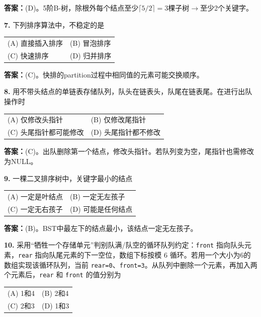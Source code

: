 \ifshowsolutions\par\noindent\textbf{答案：}(D)。5阶B-树，除根外每个结点至少$\lceil5/2\rceil=3$棵子树$\to$至少2个关键字。\else \answerarea \fi

\vspace{6pt}

\noindent\textbf{7.} 下列排序算法中，不稳定的是
\begin{center}
\begin{tabular}{ll}
(A) 直接插入排序 & (B) 冒泡排序 \\[6pt]
(C) 快速排序 & (D) 归并排序
\end{tabular}
\end{center}

\ifshowsolutions\par\noindent\textbf{答案：}(C)。快排的partition过程中相同值的元素可能交换顺序。\else \answerarea \fi

\vspace{6pt}

\noindent\textbf{8.} 用不带头结点的单链表存储队列，队头在链表头，队尾在链表尾。在进行出队操作时
\begin{center}
\begin{tabular}{ll}
(A) 仅修改头指针 & (B) 仅修改尾指针 \\[6pt]
(C) 头尾指针都可能修改 & (D) 头尾指针都不修改
\end{tabular}
\end{center}

\ifshowsolutions\par\noindent\textbf{答案：}(C)。出队删除第一个结点，修改头指针。若队列变为空，尾指针也需修改为NULL。\else \answerarea \fi

\vspace{6pt}

\noindent\textbf{9.} 一棵二叉排序树中，关键字最小的结点
\begin{center}
\begin{tabular}{ll}
(A) 一定是叶结点 & (B) 一定无左孩子 \\[6pt]
(C) 一定无右孩子 & (D) 可能是任何结点
\end{tabular}
\end{center}

\ifshowsolutions\par\noindent\textbf{答案：}(B)。BST中最左下的结点最小，该结点一定无左孩子。\else \answerarea \fi

\vspace{6pt}

\noindent\textbf{10.} 采用“牺牲一个存储单元”判别队满/队空的循环队列约定：\texttt{front} 指向队头元素，\texttt{rear} 指向队尾元素的下一空位，数组下标按模 6 循环。若用一个大小为6的数组实现该循环队列，当前 \texttt{rear=0}、\texttt{front=3}。从队列中删除一个元素，再加入两个元素后，\texttt{rear} 和 \texttt{front} 的值分别为
\begin{center}
\begin{tabular}{ll}
(A) 1和4 & (B) 2和4 \\[6pt]
(C) 2和3 & (D) 1和3
\end{tabular}
\end{center}


